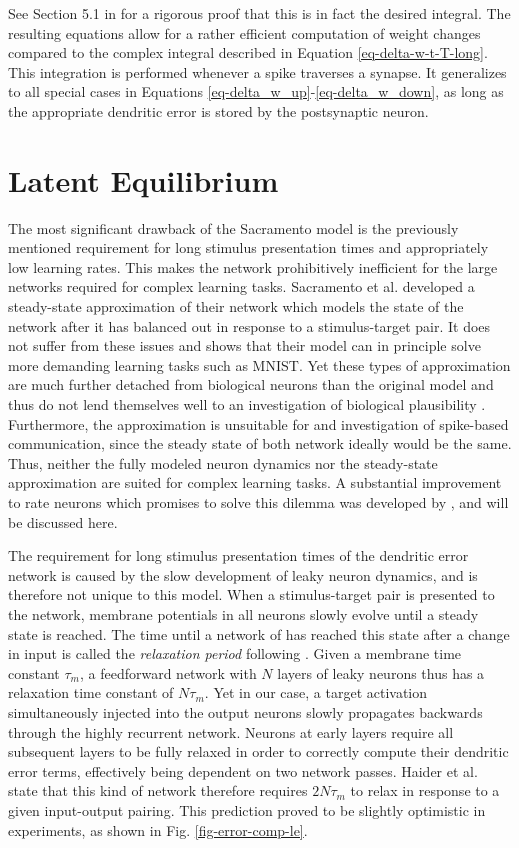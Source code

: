See Section 5.1 in \citep{Stapmanns2021} for a rigorous proof that this is in fact the desired integral. The resulting
equations allow for a rather efficient computation of weight changes compared to the complex integral described in
Equation \ref{eq-delta-w-t-T-long}. This integration is performed whenever a spike traverses a synapse. It generalizes
to all special cases in Equations \ref{eq-delta_w_up}-\ref{eq-delta_w_down}, as long as the appropriate dendritic
error is stored by the postsynaptic neuron.

\section{Latent Equilibrium}\label{sec-latent-eq}

The most significant drawback of the Sacramento model is the previously mentioned requirement for long stimulus
presentation times and appropriately low learning rates. This makes the network prohibitively inefficient for the large
networks required for complex learning tasks. Sacramento et al. developed a steady-state approximation of their network
which models the state of the network after it has balanced out in response to a stimulus-target pair. It does not
suffer from these issues and shows that their model can in principle solve more demanding learning tasks such as MNIST.
Yet these types of approximation are much further detached from biological neurons than the original model and thus do
not lend themselves well to an investigation of biological plausibility \citep{Gerstner2009}. Furthermore, the
approximation is unsuitable for and investigation of spike-based communication, since the steady state of both network
ideally would be the same. Thus, neither the fully modeled neuron dynamics nor the steady-state approximation are suited
for complex learning tasks. A substantial improvement to rate neurons which promises to solve this dilemma was developed
by \citep{Haider2021}, and will be discussed here.
\newline

The requirement for long stimulus presentation times of the dendritic error network is caused by the slow development of
leaky neuron dynamics, and is therefore not unique to this model. When a stimulus-target pair is presented to the
network, membrane potentials in all neurons slowly evolve until a steady state is reached. The time until a network of
has reached this state after a change in input is called the \textit{relaxation period} following \citep{Haider2021}.
Given a membrane time constant $\tau_m$, a feedforward network with $N$ layers of leaky neurons thus has a relaxation
time constant of $N \tau_m$. Yet in our case, a target activation simultaneously injected into the output neurons slowly
propagates backwards through the highly recurrent network. Neurons at early layers require all subsequent layers to be
fully relaxed in order to correctly compute their dendritic error terms, effectively being dependent on two network
passes. Haider et al. state that this kind of network therefore requires $2N\tau_m$ to relax in response to a given
input-output pairing. This prediction proved to be slightly optimistic in experiments, as shown in Fig.
\ref{fig-error-comp-le}.

